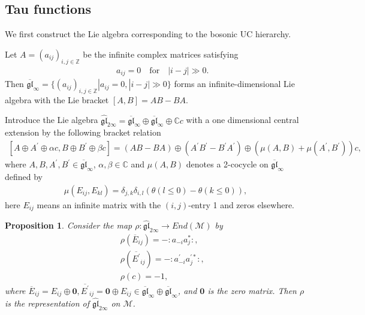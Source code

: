 \documentclass[11pt,reqno]{amsart}
\numberwithin{equation}{section}
\newtheorem{proposition}[theorem]{Proposition}
\begin{document}
\subsection{Tau functions}
We first construct the Lie algebra corresponding to the bosonic UC hierarchy.

Let $A=(a_{ij})_{i,j\in\mathbb{Z}}$ be the infinite complex matrices satisfying
\begin{eqnarray}\label{a_martix}
&&a_{ij}=0\quad \text{for}\quad |i-j|\gg0.
\end{eqnarray}
Then $\mathfrak{\overline{gl}}_{\infty}=\{(a_{ij})_{i,j\in\mathbb{Z}}|a_{ij}=0,|i-j|\gg0\}$ forms an infinite-dimensional Lie algebra with the Lie bracket $[A,B]=AB-BA$.

Introduce the Lie algebra $\mathfrak{\widehat{gl}}_{2\infty}=\mathfrak{\overline{gl}}_{\infty}\oplus
\mathfrak{\overline{gl}}_{\infty}\oplus\mathbb{C}c$ with a one dimensional central extension by the following bracket relation
\begin{eqnarray}\label{affine_bracket}
[A\oplus A^{\prime}\oplus\alpha c,B\oplus B^{\prime}\oplus\beta c]=(AB-BA)\oplus(A^{\prime}B^{\prime}-B^{\prime}A^{\prime})\oplus
\left(\mu(A,B)+\mu(A^{\prime},B^{\prime})\right)c,
\end{eqnarray}
where $A,B,A^{\prime},B^{\prime}\in\mathfrak{\overline{gl}}_{\infty}$, $\alpha,\beta\in\mathbb{C}$ and $\mu(A,B)$ denotes a 2-cocycle on $\mathfrak{\overline{gl}}_{\infty}$ defined by
\begin{eqnarray}
\mu(E_{ij},E_{kl})=\delta_{j,k}\delta_{i,l}\left(\theta(l\leq0)-\theta(k\leq0)\right),
\end{eqnarray}
here $E_{ij}$ means an infinite matrix with the $(i,j)$-entry 1 and zeros elsewhere.

\begin{proposition}
Consider the map $\rho:\mathfrak{\widehat{gl}}_{2\infty}\rightarrow End(\mathcal{M})$ by
\begin{eqnarray}
&&\rho(\overline{E}_{ij})=-:a_{-i}a^{\ast}_{j}:,\\
&&\rho(\overline{E^{\prime}}_{ij})=-:a^{\prime}_{-i}a^{\prime\ast}_{j}:,\\
&&\rho(c)=-1,
\end{eqnarray}
where $\overline{E}_{ij}=E_{ij}\oplus\mathbf{0}, \overline{E^{\prime}}_{ij}=\mathbf{0}
\oplus{E}_{ij}\in \mathfrak{\overline{gl}}_{\infty}\oplus
\mathfrak{\overline{gl}}_{\infty}$, and $\mathbf{0}$ is the zero matrix. Then $\rho$ is the representation of $\mathfrak{\widehat{gl}}_{2\infty}$ on $\mathcal{M}$.
\end{proposition}
\end{document}
